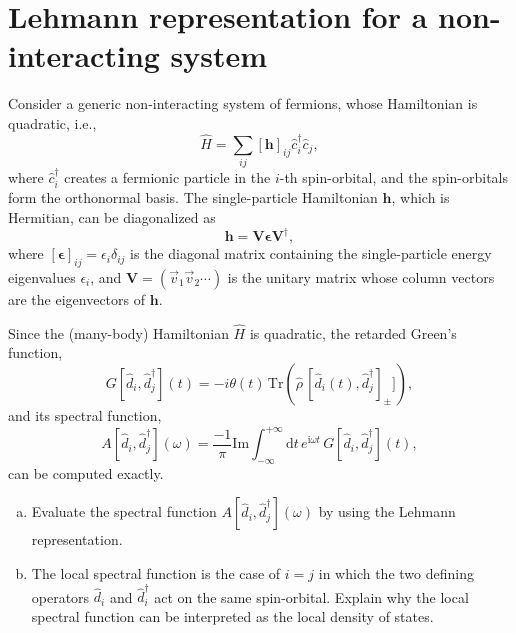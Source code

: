 \documentclass[11pt,a4paper,oneside]{article}
\begin{document}
\section*{Lehmann representation for a non-interacting system}

Consider a generic non-interacting system of fermions, whose Hamiltonian is quadratic, i.e.,
\begin{equation}
\hat{H} = \sum_{ij} [ \boldsymbol{h} ]_{ij} \hat{c}_{i}^\dagger \hat{c}_{j} ,
\end{equation}
where $\hat{c}_{i}^\dagger$ creates a fermionic particle in the $i$-th spin-orbital, and the spin-orbitals form the orthonormal basis.
The single-particle Hamiltonian $\boldsymbol{h}$, which is Hermitian, can be diagonalized as
\begin{equation}
\boldsymbol{h} = \boldsymbol{V} \boldsymbol{\epsilon} \boldsymbol{V}^\dagger,
\end{equation}
where $[\boldsymbol{\epsilon}]_{ij} = \epsilon_i \delta_{ij}$ is the diagonal matrix containing the single-particle energy eigenvalues $\epsilon_i$,
and $\boldsymbol{V} = ( \vec{v}_1 \vec{v}_2 \cdots )$ is the unitary matrix whose column vectors are the eigenvectors of $\boldsymbol{h}$.

Since the (many-body) Hamiltonian $\hat{H}$ is quadratic, the retarded Green's function,
\begin{equation}
G[\hat{d}_i, \hat{d}_j^\dagger] (t) = -i \theta (t) \, \mathrm{Tr}\!\left( \hat{\rho} \, [ \hat{d}_i (t), \hat{d}_j^\dagger ]_\pm ] \right),
\end{equation}
and its spectral function,
\begin{equation}
A[\hat{d}_i, \hat{d}_j^\dagger] (\omega) = \frac{-1}{\pi} \mathrm{Im} \int_{-\infty}^{+\infty} \mathrm{d}t \, e^{\mathrm{i} \omega t} \, G[\hat{d}_i, \hat{d}_j^\dagger] (t),
\end{equation}
can be computed exactly.

\begin{enumerate}[(a)]

\item
Evaluate the spectral function $A[\hat{d}_i, \hat{d}_j^\dagger] (\omega)$ by using the Lehmann representation.

\item
The local spectral function is the case of $i = j$ in which the two defining operators $\hat{d}_i$ and $\hat{d}_i^\dagger$ act on the same spin-orbital.
Explain why the local spectral function can be interpreted as the local density of states.

\end{enumerate}
\end{document}
